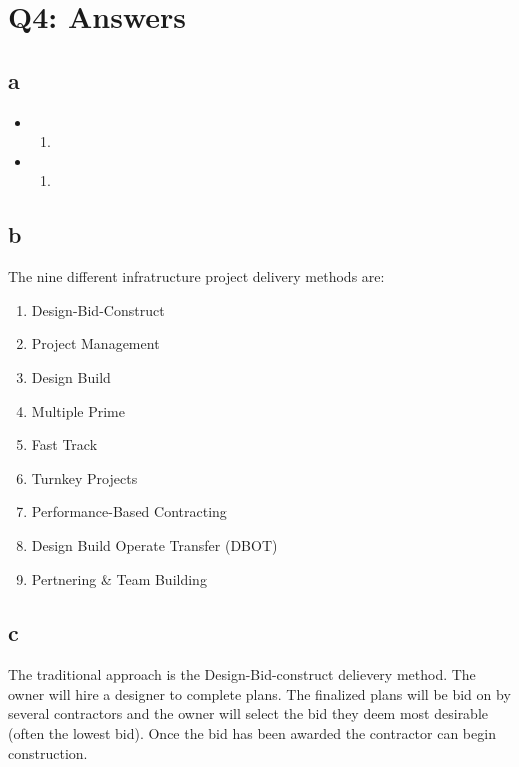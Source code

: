 \documentclass[12pt]{article} %
\begin{document}
\section{Q4: Answers}
	
	\subsection{a}
		\begin{itemize}
			\item \begin{enumerate}
					\item
				\end{enumerate}
			\item \begin{enumerate}
					\item
				\end{enumerate}
		\end{itemize}

	\subsection{b}
		The nine different infratructure project delivery methods are:
		\begin{enumerate}
			\item Design-Bid-Construct
			\item Project Management
			\item Design Build
			\item Multiple Prime
			\item Fast Track
			\item Turnkey Projects
			\item Performance-Based Contracting
			\item Design Build Operate Transfer (DBOT)
			\item Pertnering \& Team Building
		\end{enumerate}
		
	\subsection{c}
		The traditional approach is the Design-Bid-construct delievery method. The owner will hire a designer to complete plans. The finalized plans will be bid on by several contractors and the owner will select the bid they deem most desirable (often the lowest bid). Once the bid has been awarded the contractor can begin construction.
		
\end{document}
